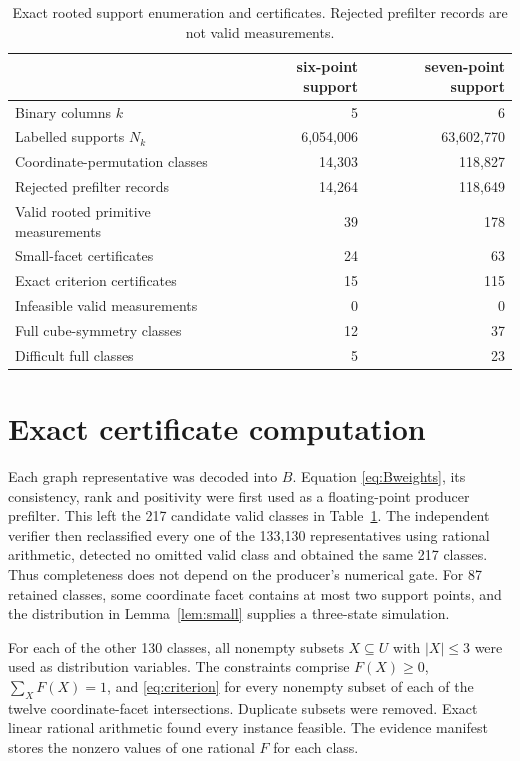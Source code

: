 \documentclass[11pt]{article}
\begin{document}
\begin{table}[ht]
\centering
\caption{Exact rooted support enumeration and certificates. Rejected
prefilter records are not valid measurements.}
\label{tab:counts}
\begin{tabular}{lrr}
\toprule
 & six-point support & seven-point support \\
\midrule
Binary columns $k$ & 5 & 6 \\
Labelled supports $N_k$ & 6,054,006 & 63,602,770 \\
Coordinate-permutation classes & 14,303 & 118,827 \\
Rejected prefilter records & 14,264 & 118,649 \\
Valid rooted primitive measurements & 39 & 178 \\
Small-facet certificates & 24 & 63 \\
Exact criterion certificates & 15 & 115 \\
Infeasible valid measurements & 0 & 0 \\
Full cube-symmetry classes & 12 & 37 \\
Difficult full classes & 5 & 23 \\
\bottomrule
\end{tabular}
\end{table}

\section{Exact certificate computation}

Each graph representative was decoded into $B$. Equation
\eqref{eq:Bweights}, its consistency, rank and positivity were first used as a
floating-point producer prefilter. This left the 217 candidate valid classes
in Table~\ref{tab:counts}. The independent verifier then reclassified every
one of the 133,130 representatives using rational arithmetic, detected no
omitted valid class and obtained the same 217 classes. Thus completeness does
not depend on the producer's numerical gate. For 87 retained classes, some
coordinate facet contains at most two support points, and the distribution in
Lemma~\ref{lem:small} supplies a three-state simulation.

For each of the other 130 classes, all nonempty subsets $X\subseteq U$ with
$|X|\leq3$ were used as distribution variables. The constraints comprise
$F(X)\geq0$, $\sum_XF(X)=1$, and \eqref{eq:criterion} for every nonempty
subset of each of the twelve coordinate-facet intersections. Duplicate
subsets were removed. Exact linear rational arithmetic found every instance
feasible. The evidence manifest stores the nonzero values of one rational
$F$ for each class.
\end{document}
